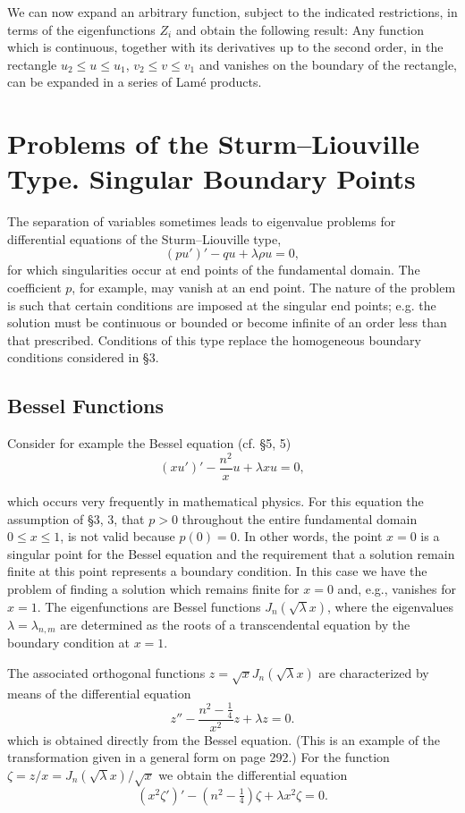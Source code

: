 We can now expand an arbitrary function, subject to the indicated restrictions, in terms of the eigenfunctions $Z_i$ and obtain the following result: Any function which is continuous, together with its derivatives up to the second order, in the rectangle $u_2\le u\le u_1$, $v_2\le v\le v_1$ and vanishes on the boundary of the rectangle, can be expanded in a series of Lam\'e products.

\section{Problems of the Sturm--Liouville Type. Singular Boundary Points}
The separation of variables sometimes leads to eigenvalue problems for differential equations of the Sturm--Liouville type,
\[
(pu')'-qu+\lambda\rho u=0,
\]
for which singularities occur at end points of the fundamental domain. The coefficient $p$, for example, may vanish at an end point. The nature of the problem is such that certain conditions are imposed at the singular end points; e.g. the solution must be continuous or bounded or become infinite of an order less than that prescribed. Conditions of this type replace the homogeneous boundary conditions considered in \S3.

\subsection{Bessel Functions}
Consider for example the Bessel equation (cf. \S5, 5)
\begin{equation}
(xu')'-\frac{n^2}{x}u+\lambda xu=0,
\tag{41}
\end{equation}

which occurs very frequently in mathematical physics. For this equation the assumption of \S3, 3, that $p>0$ throughout the entire fundamental domain $0\le x\le 1$, is not valid because $p(0)=0$. In other words, the point $x=0$ is a singular point for the Bessel equation and the requirement that a solution remain finite at this point represents a boundary condition. In this case we have the problem of finding a solution which remains finite for $x=0$ and, e.g., vanishes for $x=1$. The eigenfunctions are Bessel functions $J_n(\sqrt{\lambda}x)$, where the eigenvalues $\lambda=\lambda_{n,m}$ are determined as the roots of a transcendental equation by the boundary condition at $x=1$.

The associated orthogonal functions $z=\sqrt{x}J_n(\sqrt{\lambda}x)$ are characterized by means of the differential equation
\begin{equation}
z''-\frac{n^2-\frac14}{x^2}z+\lambda z=0.
\tag{42}
\end{equation}
which is obtained directly from the Bessel equation. (This is an example of the transformation given in a general form on page 292.) For the function $\zeta=z/x=J_n(\sqrt{\lambda}x)/\sqrt{x}$ we obtain the differential equation
\begin{equation}
(x^2\zeta')'-(n^2-\tfrac14)\zeta+\lambda x^2\zeta=0.
\tag{43}
\end{equation}

